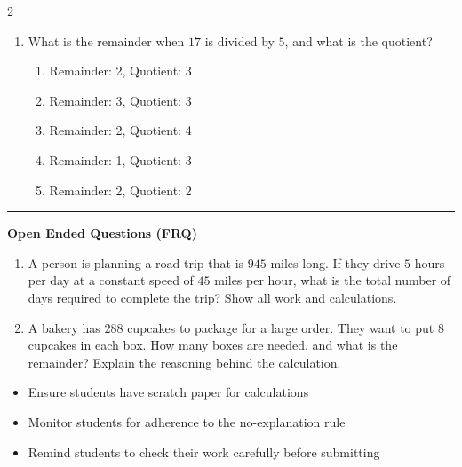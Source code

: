 \documentclass[10pt]{article}
\begin{document}
\begin{multicols}{2}
\begin{enumerate}[label=\textbf{Q\arabic*.}, leftmargin=*, itemsep=6pt, parsep=0pt]
  \item \small What is the remainder when $17$ is divided by $5$, and what is the quotient?
  \begin{enumerate}[label=(\Alph*), leftmargin=0.6cm, nosep, itemsep=2pt]
    \item Remainder: 2, Quotient: 3
    \item Remainder: 3, Quotient: 3
    \item Remainder: 2, Quotient: 4
    \item Remainder: 1, Quotient: 3
    \item Remainder: 2, Quotient: 2
  \end{enumerate}

\end{enumerate}
\end{multicols}

\vspace{-0.2cm}
\hrule
\vspace{0.2cm}
\textbf{\small Open Ended Questions (FRQ)}
\begin{enumerate}[label=\textbf{Q\arabic*.}, start=9, itemsep=5pt, topsep=0pt]

  \item \small A person is planning a road trip that is $945$ miles long. If they drive $5$ hours per day at a constant speed of $45$ miles per hour, what is the total number of days required to complete the trip? Show all work and calculations. \vspace{2cm}

  \item \small A bakery has $288$ cupcakes to package for a large order. They want to put $8$ cupcakes in each box. How many boxes are needed, and what is the remainder? Explain the reasoning behind the calculation. \vspace{2cm}

\end{enumerate}

\vfill

\begin{tcolorbox}[colback=blue!5, colframe=mainblue!50, title=\small \textbf{Chef's Tips}, fonttitle=\bfseries, bottom=1mm]
\begin{itemize}[noitemsep, topsep=2pt, leftmargin=0.5cm]
  \item \scriptsize Ensure students have scratch paper for calculations\item \scriptsize Monitor students for adherence to the no-explanation rule\item \scriptsize Remind students to check their work carefully before submitting
\end{itemize}
\end{tcolorbox}
\end{document}
